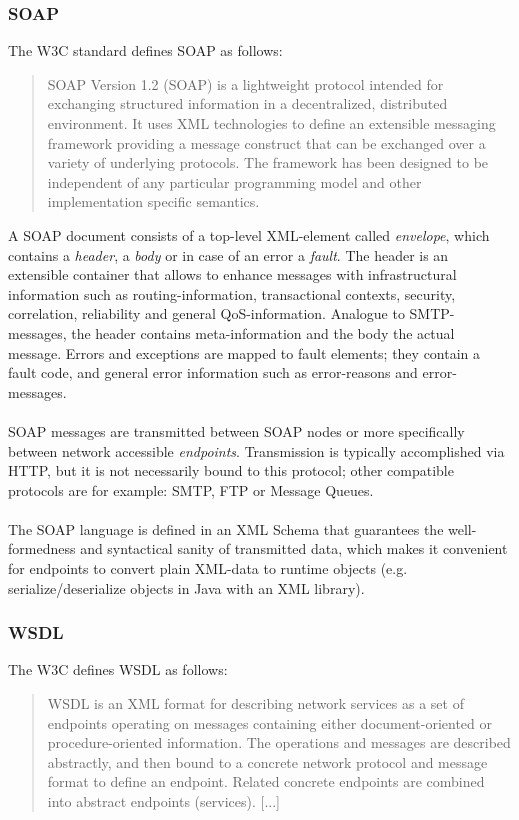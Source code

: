 
\subsubsection*{SOAP}

The W3C standard defines SOAP as follows:
\begin{quote}
SOAP Version 1.2 (SOAP) is a lightweight protocol intended for exchanging structured information in a decentralized, distributed environment. It uses XML technologies to define an extensible messaging framework providing a message construct that can be exchanged over a variety of underlying protocols. The framework has been designed to be independent of any particular programming model and other implementation specific semantics. \cite{SOAPCORE}
\end{quote}
A SOAP document consists of a top-level XML-element called \emph{envelope}, which contains a \emph{header}, a \emph{body} or in case of an error a \emph{fault}. The header is an extensible container that allows to enhance messages with infrastructural information such as routing-information, transactional contexts, security, correlation, reliability and general QoS-information. Analogue to SMTP-messages, the header contains meta-information and the body the actual message. Errors and exceptions are mapped to fault elements; they contain a fault code, and general error information such as error-reasons and error-messages.
\\ \\
SOAP messages are transmitted between SOAP nodes or more specifically between network accessible \emph{endpoints}. Transmission is typically accomplished via HTTP, but it is not necessarily bound to this protocol; other compatible protocols are for example: SMTP, FTP or Message Queues. \cite{BIGREST}
\\ \\
The SOAP language is defined in an XML Schema that guarantees the well-formedness and syntactical sanity of transmitted data, which makes it convenient for endpoints to convert plain XML-data to runtime objects (e.g. serialize/deserialize objects in Java with an XML library).

\subsubsection*{WSDL}

The W3C defines WSDL as follows:
\begin{quote}
WSDL is an XML format for describing network services as a set of endpoints operating on messages containing either document-oriented or procedure-oriented information. The operations and messages are described abstractly, and then bound to a concrete network protocol and message format to define an endpoint. Related concrete endpoints are combined into abstract endpoints (services). [...] \cite{WSDLCORE}
\end{quote}

